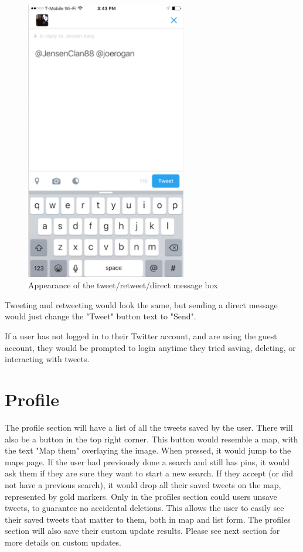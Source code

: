 \documentclass[11pt]{article}
\begin{document}
\begin{figure}[H]
    \centering
    \includegraphics[width=7cm]{retweetBox}
    \caption{Appearance of the tweet/retweet/direct message box}
    \label{fig:TweetInteractionBoxAppearance}
\end{figure}

Tweeting and retweeting would look the same, but sending a direct message would just change the "Tweet" button text to "Send".

If a user has not logged in to their Twitter account, and are using the guest account, they would be prompted to login anytime they tried saving, deleting, or interacting with tweets.

\section{Profile}
The profile section will have a list of all the tweets saved by the user. There will also be a button in the top right corner. This button would resemble a map, with the text "Map them" overlaying the image. When pressed, it would jump to the maps page. If the user had previously done a search and still has pins, it would ask them if they are sure they want to start a new search. If they accept (or did not have a previous search), it would drop all their saved tweets on the map, represented by gold markers. Only in the profiles section could users unsave tweets, to guarantee no accidental deletions. This allows the user to easily see their saved tweets that matter to them, both in map and list form. The profiles section will also save their custom update results. Please see next section for more details on custom updates.
\end{document}
